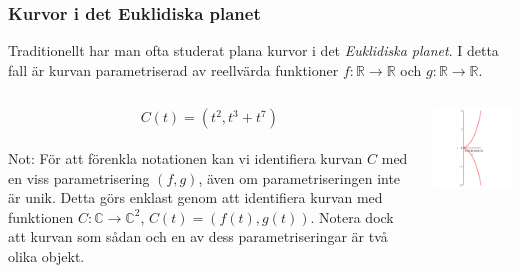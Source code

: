 \documentclass{beamer}
\begin{document}
\begin{frame}
	\frametitle{Kurvor i det Euklidiska planet}
	Traditionellt har man ofta studerat plana kurvor i det \emph{Euklidiska planet}. I detta fall är kurvan parametriserad av reellvärda funktioner $f : \mathbb{R} \rightarrow \mathbb{R}$ och 
	$g : \mathbb{R} \rightarrow \mathbb{R}$.
	
  	\begin{example}
		\begin{columns}[onlytextwidth]
			\begin{column}{0.5\textwidth}
				\[C(t)=(t^2,t^3+t^7)\]\\[20pt]
				\scriptsize Not: För att förenkla notationen kan vi identifiera kurvan $C$ med en viss parametrisering $(f, g)$, även om parametriseringen inte är unik. Detta görs enklast genom att identifiera kurvan med funktionen $C : \mathbb{C} \rightarrow \mathbb{C}^2$, $C(t) = \left(f(t), g(t)\right)$. Notera dock att kurvan som sådan och en av dess parametriseringar är två olika objekt.
			\end{column}
			\begin{column}{0.5\textwidth}
				\includegraphics[scale=0.35]{Export/blowupex1_1.png}
			\end{column}
		\end{columns}
  	\end{example}
\end{frame}
\end{document}
